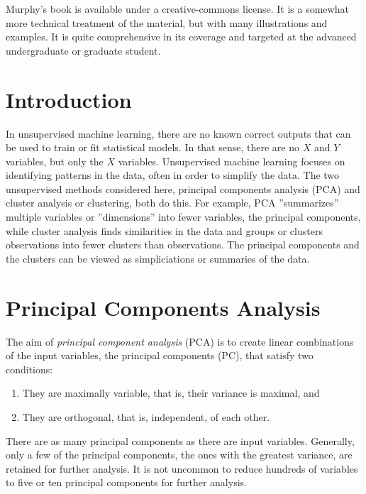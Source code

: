 Murphy's book is available under a creative-commons license. It is a somewhat more technical treatment of the material, but with many illustrations and examples. It is quite comprehensive in its coverage and targeted at the advanced undergraduate or graduate student. 

\section{Introduction}

In unsupervised machine learning, there are no known correct outputs that can be used to train or fit statistical models. In that sense, there are no $X$ and $Y$ variables, but only the $X$ variables. Unsupervised machine learning focuses on identifying patterns in the data, often in order to simplify the data. The two unsupervised methods considered here, principal components analysis (PCA) and cluster analysis or clustering, both do this. For example, PCA ''summarizes'' multiple variables or ''dimensions'' into fewer variables, the principal components, while cluster analysis finds similarities in the data and groups or clusters observations into fewer clusters than observations. The principal components and the clusters can be viewed as simpliciations or summaries of the data. 

\section{Principal Components Analysis}

The aim of \emph{principal component analysis} (PCA) is to create linear combinations of the input variables, the principal components (PC), that satisfy two conditions:

\begin{enumerate}
\item They are maximally variable, that is, their variance is maximal, and
\item They are orthogonal, that is, independent, of each other.
\end{enumerate}

There are as many principal components as there are input variables. Generally, only a few of the principal components, the ones with the greatest variance, are retained for further analysis. It is not uncommon to reduce hundreds of variables to five or ten principal components for further analysis.

